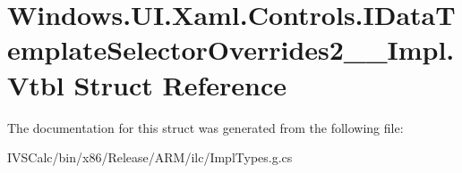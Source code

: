 \hypertarget{struct_windows_1_1_u_i_1_1_xaml_1_1_controls_1_1_i_data_template_selector_overrides2_____impl_1_1_vtbl}{}\section{Windows.\+U\+I.\+Xaml.\+Controls.\+I\+Data\+Template\+Selector\+Overrides2\+\_\+\+\_\+\+Impl.\+Vtbl Struct Reference}
\label{struct_windows_1_1_u_i_1_1_xaml_1_1_controls_1_1_i_data_template_selector_overrides2_____impl_1_1_vtbl}


The documentation for this struct was generated from the following file\+:\begin{DoxyCompactItemize}
\item 
I\+V\+S\+Calc/bin/x86/\+Release/\+A\+R\+M/ilc/Impl\+Types.\+g.\+cs\end{DoxyCompactItemize}
